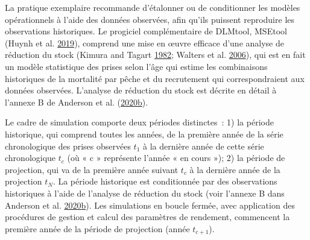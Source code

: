 \documentclass[11pt]{book}
\begin{document}
La pratique exemplaire recommande d'étalonner ou de conditionner les modèles opérationnels à l'aide des données observées, afin qu'ils puissent reproduire les observations historiques. Le progiciel complémentaire de DLMtool, MSEtool (Huynh et al. \protect\hyperlink{ref-huynh_msetool_2019}{2019}), comprend une mise en œuvre efficace d'une analyse de réduction du stock (Kimura and Tagart \protect\hyperlink{ref-kimura1982}{1982}; Walters et al. \protect\hyperlink{ref-walters2006}{2006}), qui est en fait un modèle statistique des prises selon l'âge qui estime les combinaisons historiques de la mortalité par pêche et du recrutement qui correspondraient aux données observées. L'analyse de réduction du stock est décrite en détail à l'annexe B de Anderson et al. (\protect\hyperlink{ref-anderson2020gfmp}{2020}\protect\hyperlink{ref-anderson2020gfmp}{b}).

Le cadre de simulation comporte deux périodes distinctes~: 1) la période historique, qui comprend toutes les années, de la première année de la série chronologique des prises observées \(t_1\) à la dernière année de cette série chronologique \(t_c\) (où « c » représente l'année « en cours »); 2) la période de projection, qui va de la première année suivant \(t_c\) à la dernière année de la projection \(t_N\). La période historique est conditionnée par des observations historiques à l'aide de l'analyse de réduction du stock (voir l'annexe B dans Anderson et al. \protect\hyperlink{ref-anderson2020gfmp}{2020}\protect\hyperlink{ref-anderson2020gfmp}{b}). Les simulations en boucle fermée, avec application des procédures de gestion et calcul des paramètres de rendement, commencent la première année de la période de projection (année \(t_{c+1}\)).
\end{document}
